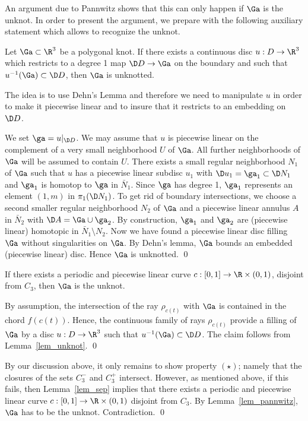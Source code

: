An argument due to Pannwitz shows that this can only happen if $\Ga$ is the unknot.
In order to present the argument, we prepare with the following auxiliary statement which allows to recognize the unknot.

\blem\label{lem_unknot}
Let $\Ga\subset \R^3$ be a polygonal knot. If there exists a continuous disc $u:D\to\R^3$
which restricts to a degree 1 map $\D D\to\Ga$ on the boundary and such that $u^{-1}(\Ga)\subset\D D$,
then $\Ga$ is unknotted.
\elem

\proof
The idea is to use Dehn's Lemma and therefore we need to manipulate $u$ in order to make it piecewise linear and to insure that it restricts to an embedding on 
$\D D$.

We set $\ga=u|_{\D D}$.
We may assume that $u$ is piecewise linear on the complement of a very small neighborhood $U$ of $\Ga$. 
All further neighborhoods of $\Ga$ will be assumed to contain $U$.
There exists a small regular neighborhood $N_1$ of $\Ga$ such that $u$ has a piecewise linear subdisc $u_1$
with $\D u_1=\ga_1\subset\D N_1$ and $\ga_1$ is  homotop to $\ga$ in $\bar N_1$. Since $\ga$ has degree 1,
$\ga_1$ represents an element $(1,m)$ in $\pi_1(\D N_1)$. To get rid of boundary intersections, we choose a second smaller regular neighborhood
$N_2$ of $\Ga$ and a piecewise linear annulus $A$ in $\bar N_2$ with $\D A=\Ga\cup\ga_2$.
By construction, $\ga_1$ and $\ga_2$ are (piecewise linear) homotopic in $\bar N_1\setminus N_2$.
Now we have found a piecewise linear disc filling $\Ga$ without singularities on $\Ga$.
By Dehn's lemma, $\Ga$ bounds an embedded (piecewise linear) disc. Hence $\Ga$ is unknotted.
\qed

\blem[Pannwitz]\label{lem_pannwitz}
If there exists a periodic and piecewise linear curve $c:[0,1]\to\R\times(0,1)$, disjoint from $C_3$, then
$\Ga$ is the unknot.
\elem

\proof
By assumption, the intersection of the ray $\rho_{c(t)}$ with $\Ga$ is contained in the chord $f(c(t))$.
Hence, the continuous family of rays $\rho_{c(t)}$ provide a filling of $\Ga$ by
a disc $u:D\to \R^3$ such that $u^{-1}(\Ga)\subset\D D$. The claim follows from Lemma~\ref{lem_unknot}.
\qed

By our discussion above, it only remains to show property $(\star)$; namely that
the closures of the sets $C_3^-$ and $C_3^+$ intersect.  
However, as mentioned above, if this fails, then Lemma~\ref{lem_sep} implies that 
there exists a periodic and piecewise linear curve $c:[0,1]\to\R\times(0,1)$ disjoint from $C_3$.
By Lemma~\ref{lem_pannwitz}, $\Ga$ has to be the unknot. Contradiction.
\qed



